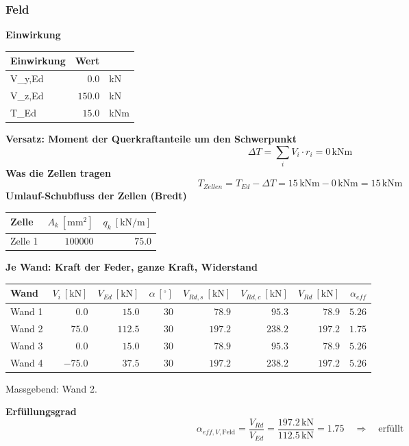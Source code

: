 \documentclass[11pt,a4paper]{article}
\begin{document}
\subsubsection{Feld}
\noindent\textbf{Einwirkung}
\begin{longtable}{lrl}
\hline
Einwirkung & Wert &  \\
\hline
\endhead
V\_y,Ed & $0.0$ & kN \\
V\_z,Ed & $150.0$ & kN \\
T\_Ed & $15.0$ & kNm \\
\hline
\end{longtable}
\noindent\textbf{Versatz: Moment der Querkraftanteile um den Schwerpunkt}
\begin{equation*}
\Delta T = \sum_i V_i \cdot r_i = 0\,\mathrm{kNm}
\end{equation*}
\noindent\textbf{Was die Zellen tragen}
\begin{equation*}
T_{Zellen} = T_{Ed} - \Delta T = 15\,\mathrm{kNm} - 0\,\mathrm{kNm} = 15\,\mathrm{kNm}
\end{equation*}
\noindent\textbf{Umlauf-Schubfluss der Zellen (Bredt)}
\begin{longtable}{lrr}
\hline
Zelle & $A_k\ [\mathrm{mm}^2]$ & $q_k\ [\mathrm{kN/m}]$ \\
\hline
\endhead
Zelle 1 & $100000$ & $75.0$ \\
\hline
\end{longtable}
\noindent\textbf{Je Wand: Kraft der Feder, ganze Kraft, Widerstand}
\begin{longtable}{lrrrrrrr}
\hline
Wand & $V_i\ [\mathrm{kN}]$ & $V_{Ed}\ [\mathrm{kN}]$ & $\alpha\ [{}^{\circ}]$ & $V_{Rd,s}\ [\mathrm{kN}]$ & $V_{Rd,c}\ [\mathrm{kN}]$ & $V_{Rd}\ [\mathrm{kN}]$ & $\alpha_{eff}$ \\
\hline
\endhead
Wand 1 & $0.0$ & $15.0$ & $30$ & $78.9$ & $95.3$ & $78.9$ & $5.26$ \\
Wand 2 & $75.0$ & $112.5$ & $30$ & $197.2$ & $238.2$ & $197.2$ & $1.75$ \\
Wand 3 & $0.0$ & $15.0$ & $30$ & $78.9$ & $95.3$ & $78.9$ & $5.26$ \\
Wand 4 & $-75.0$ & $37.5$ & $30$ & $197.2$ & $238.2$ & $197.2$ & $5.26$ \\
\hline
\end{longtable}
Massgebend: Wand 2.

\noindent\textbf{Erfüllungsgrad}
\begin{equation*}
\alpha_{eff,V,\text{Feld}} = \frac{V_{Rd}}{V_{Ed}} = \frac{197.2\,\mathrm{kN}}{112.5\,\mathrm{kN}} = 1.75 \quad \Rightarrow \quad \text{erfüllt}
\end{equation*}
\end{document}

